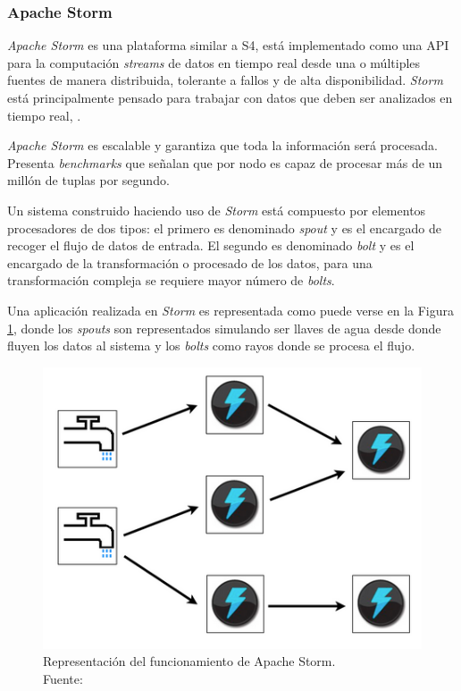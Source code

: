 \subsubsection*{Apache Storm}
\label{arte:SPS:storm}
					
\textit{Apache Storm} es una plataforma similar a S4, está implementado como una API para la computación \textit{streams} de datos en tiempo real desde una o múltiples fuentes de manera distribuida, tolerante a fallos y de alta disponibilidad. \textit{Storm} está principalmente pensado para trabajar con datos que deben ser analizados en tiempo real, \cite{Storm}.

\textit{Apache Storm} es escalable y garantiza que toda la información será procesada. Presenta \textit{benchmarks} que señalan que por nodo es capaz de procesar más de un millón de tuplas por segundo.

Un sistema construido haciendo uso de \textit{Storm} está compuesto por elementos procesadores de dos tipos: el primero es denominado \textit{spout} y es el encargado de recoger el flujo de datos de entrada. El segundo es denominado \textit{bolt} y es el encargado de la transformación o procesado de los datos, para una transformación compleja se requiere mayor número de \textit{bolts}.

Una aplicación realizada en \textit{Storm} es representada como puede verse en la Figura \ref{fig:stormBeLike}, donde los \textit{spouts} son representados simulando ser llaves de agua desde donde fluyen los datos al sistema y los \textit{bolts} como rayos donde se procesa el flujo.

\begin{figure}[H]
	\centering
	\captionsetup{justification=centering}
	\includegraphics[scale=0.6]{images/stormBeLike.png}
	\caption[Representación del funcionamiento de Apache Storm.]{Representación del funcionamiento de Apache Storm.\\Fuente: \cite{StormFigure}}
	\label{fig:stormBeLike}
\end{figure}

